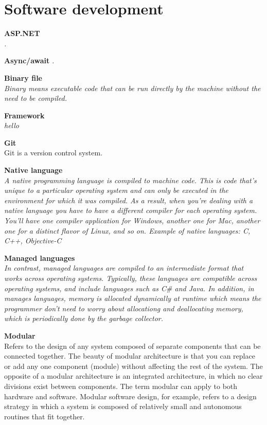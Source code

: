 \section{Software development}

\textbf{ASP.NET} \\
\textit{.} 

\textbf{Async/await}
\textit{.}

\textbf{Binary file} \\
\textit{Binary means executable code that can be run directly by the machine without the need to be compiled.}

\textbf{Framework} \\
\textit{hello}

\textbf{Git} \\
Git is a version control system. 

\textbf{Native language} \\
\textit{A native programming language is compiled to machine code. This is code that's unique to a particular operating system and can only be executed in the environment for which it was compiled. As a result, when you're dealing with a native language you have to have a different compiler for each operating system. You'll have one compiler application for Windows, another one for Mac, another one for a distinct flavor of Linux, and so on. Example of native languages: C, C++, Objective-C }

\textbf{Managed languages} \\
\textit{In contrast, managed languages are compiled to an intermediate format that works across operating systems. Typically, these languages are compatible across operating systems, and include languages such as C\# and Java. In addition, in manages languages, memory is allocated dynamically at runtime which means the programmer don't need to worry about allocationg and deallocating memory, which is periodically done by the garbage collector. }

\textbf{Modular} \\
Refers to the design of any system composed of separate components that can be connected together. The beauty of modular architecture is that you can replace or add any one component (module) without affecting the rest of the system. The opposite of a modular architecture is an integrated architecture, in which no clear divisions exist between components. The term modular can apply to both hardware and software. Modular software design, for example, refers to a design strategy in which a system is composed of relatively small and autonomous routines that fit together. 

